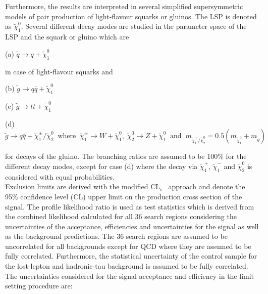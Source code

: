 \\
\\
Furthermore, the results are interpreted in several simplified supersymmetric models of pair production of light-flavour squarks or gluinos. The LSP is denoted as $\tilde{\chi}_1^0$. Several different decay modes are studied in the parameter space of the LSP and the squark or gluino which are
\begin{description}
\item (a) $\tilde{q} \rightarrow q + \tilde{\chi}_1^0$
\end{description} 
in case of light-flavour squarks and
\begin{description}
\item (b) $\tilde{g} \rightarrow q\bar{q} + \tilde{\chi}_1^0$
\item (c) $\tilde{g} \rightarrow t\bar{t} + \tilde{\chi}_1^0$
\item (d) $\tilde{g} \rightarrow q\bar{q} + \tilde{\chi}_1^{\pm}/\tilde{\chi}_2^0 \;\; \mathrm{where} \;\; \tilde{\chi}_1^{\pm} \rightarrow W + \tilde{\chi}_1^0, \; \tilde{\chi}_2^0 \rightarrow Z + \tilde{\chi}_1^0 \;\; \mathrm{and} \;\; m_{\tilde{\chi}_1^{\pm}/\tilde{\chi}_2^0} = 0.5(m_{{\tilde{\chi}^0_1}} + m_{\tilde{g}})$ 
\end{description}  
for decays of the gluino. The branching ratios are assumed to be 100\% for the different decay modes, except for case (d) where the decay via $\tilde{\chi}_1^{+}$, $\tilde{\chi}_1^{-}$ and $\tilde{\chi}_2^0$ is considered with equal probabilities. \\
Exclusion limits are derived with the modified $\mathrm{CL_s}$~\cite{0954-3899-28-10-313, Thomas1999435, bib:Higgs:CLS} approach and denote the 95\% confidence level (CL) upper limit on the production cross section of the signal. The profile likelihood ratio is used as test statistics which is derived from the combined likelihood calculated for all 36 search regions considering the uncertainties of the acceptance, efficiencies and uncertainties for the signal as well as the background predictions. The 36 search regions are assumed to be uncorrelated for all backgrounds except for QCD where they are assumed to be fully correlated. Furthermore, the statistical uncertainty of the control sample for the lost-lepton and hadronic-tau background is assumed to be fully correlated. The uncertainties considered for the signal acceptance and efficiency in the limit setting procedure are:  
